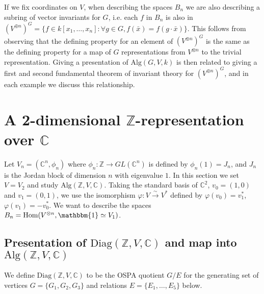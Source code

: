 \documentclass[11pt]{article} %
\begin{document}
If we fix coordinates on $V$, when describing the spaces $B_n$ we are also describing a subring of vector invariants for $G$, i.e. each $f$ in $B_n$ is also in $(V^{\oplus n})^G=\{f \in k[x_1,\ldots,x_n] : \forall g \in G, f(\bar{x}) = f(g \cdot \bar{x})\}$. This follows from observing that the defining property for an element of $(V^{\oplus n})^G$ is the same as the defining property for a map of $G$ representations from $V^{\otimes n}$ to the trivial representation. Giving a presentation of $\text{Alg}{(G,V,k)}$ is then related to giving a first and second fundamental theorem of invariant theory for $(V^{\oplus n})^G$, and in each example we discuss this relationship.



\section{A 2-dimensional $\mathbb{Z}$-representation over $\mathbb{C}$}

Let $V_n=(\mathbb{C}^n,\phi_n)$ where $\phi_n: \mathbb{Z} \rightarrow GL(\mathbb{C}^n)$ is defined by $\phi_n(1)=J_n$, and $J_n$ is the Jordan block of dimension $n$ with eigenvalue $1$. In this section we set $V=V_2$ and study $\text{Alg}{(\mathbb{Z},V, \mathbb{C})}$. Taking the standard basis of $\mathbb{C}^2$, $v_0 = (1,0)$ and  $v_1 = (0,1)$, we use the isomorphism $\varphi:V \xrightarrow{\sim} V^{\ast}$ defined by $\varphi(v_0)=v_1^{\ast}$, $\varphi(v_1)=-v_0^{\ast}$. We want to describe the spaces $B_n = \text{Hom}(V^{\otimes n},\mathbbm{1} \simeq V_1)$.

\subsection {Presentation of $\text{Diag}{(\mathbb{Z},V,\mathbb{C})}$ and map into $\text{Alg}{(\mathbb{Z},V,\mathbb{C})}$}

\begin{mydef}
We define $\text{Diag}{(\mathbb{Z},V,\mathbb{C})}$ to be the OSPA quotient $G / E$ for the generating set of vertices $G=\{G_1,G_2,G_3\}$ and relations $E=\{E_1,\dots,E_5\}$ below.
\end{mydef}
\end{document}
